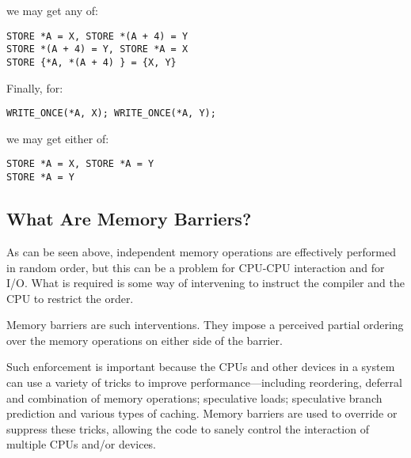 \begin{enumerate}
	we may get any of:

\begin{minipage}[t]{\columnwidth}
\scriptsize
\begin{verbatim}
STORE *A = X, STORE *(A + 4) = Y
STORE *(A + 4) = Y, STORE *A = X
STORE {*A, *(A + 4) } = {X, Y}
\end{verbatim}
\vspace{1pt}
\end{minipage}

	Finally, for:

\begin{minipage}[t]{\columnwidth}
\scriptsize
\begin{verbatim}
WRITE_ONCE(*A, X); WRITE_ONCE(*A, Y);
\end{verbatim}
\end{minipage}

	we may get either of:

\begin{minipage}[t]{\columnwidth}
\scriptsize
\begin{verbatim}
STORE *A = X, STORE *A = Y
STORE *A = Y
\end{verbatim}
\end{minipage}

\end{enumerate}

\subsection{What Are Memory Barriers?}
\label{sec:advsync:What Are Memory Barriers?}

As can be seen above, independent memory operations are effectively performed
in random order, but this can be a problem for CPU-CPU interaction and for I/O.
What is required is some way of intervening to instruct the compiler and the
CPU to restrict the order.

Memory barriers are such interventions.  They impose a perceived partial
ordering over the memory operations on either side of the barrier.

Such enforcement is important because the CPUs and other devices in a system
can use a variety of tricks to improve performance---including reordering,
deferral and combination of memory operations; speculative loads; speculative
branch prediction and various types of caching.  Memory barriers are used to
override or suppress these tricks, allowing the code to sanely control the
interaction of multiple CPUs and/or devices.

